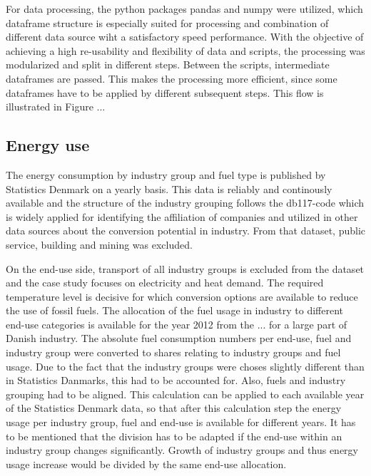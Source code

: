 \documentclass[review]{elsarticle}
\begin{document}
For data processing, the python packages pandas and numpy were utilized, which dataframe structure is especially suited for processing and combination of different data source wiht a satisfactory speed performance. With the objective of achieving a high re-usability and flexibility of data and scripts, the processing was modularized and split in different steps. Between the scripts, intermediate dataframes are passed. This makes the processing more efficient, since some dataframes have to be applied by different subsequent steps. This flow is illustrated in Figure ...  


\subsection{Energy use}
The energy consumption by industry group and fuel type is published by Statistics Denmark on a yearly basis. This data is reliably and continously available and the structure of the industry grouping follows the db117-code which is widely applied for identifying the affiliation of companies and utilized in other data sources about the conversion potential in industry. From that dataset, public service, building and mining was excluded.

On the end-use side, transport of all industry groups is excluded from the dataset and the case study focuses on electricity and heat demand. The required temperature level is decisive for which conversion options are available to reduce the use of fossil fuels. The allocation of the fuel usage in industry to different end-use categories is available for the year 2012 from the ... for a large part of Danish industry. The absolute fuel consumption numbers per end-use, fuel and industry group were converted to shares relating to industry groups and fuel usage. Due to the fact that the industry groups were choses slightly different than in Statistics Danmarks, this had to be accounted for. Also, fuels and industry grouping had to be aligned. This calculation can be applied to each available year of the Statistics Denmark data, so that after this calculation step the energy usage per industry group, fuel and end-use is available for different years. It has to be mentioned that the division has to be adapted if the end-use within an industry group changes significantly. Growth of industry groups and thus energy usage increase would be divided by the same end-use allocation.
\end{document}
